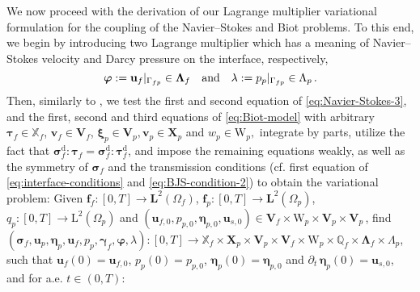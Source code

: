 \documentclass[11pt]{article}
\numberwithin{equation}{section}
\newcommand{\bgamma}{{\boldsymbol\gamma}}
\newcommand{\bLambda}{{\boldsymbol\Lambda}}
\newcommand{\bbeta}{{\boldsymbol\eta}}
\newcommand{\bsi}{{\boldsymbol\sigma}}
\newcommand{\bvarphi}{{\boldsymbol\varphi}}
\newcommand{\btau}{{\boldsymbol\tau}}
\newcommand{\bxi}{{\boldsymbol\xi}}
\newcommand{\bv}{{\mathbf{v}}}
\newcommand{\f}{\mathbf{f}}
\newcommand{\bu}{\mathbf{u}}
\newcommand{\0}{{\mathbf{0}}}
\def\bX{\mathbf{X}}
\def\bV{\mathbf{V}}
\newcommand{\bL}{\mathbf{L}}
\newcommand\bbQ{\mathbb{Q}}
\newcommand\bbX{\mathbb{X}}
\def\L{\mathrm{L}}
\def\W{\mathrm{W}}
\def\rd{\mathrm{d}}
\def\qan{{\quad\hbox{and}\quad}}
\numberwithin{equation}{section}
\begin{document}
We now proceed with the derivation of our Lagrange multiplier variational formulation for the coupling of the Navier--Stokes and Biot problems.
To this end, we begin by introducing two Lagrange multiplier which has a meaning of Navier--Stokes velocity and Darcy pressure on the interface, respectively,
\begin{equation*}
\bvarphi := \bu_f|_{\Gamma_{fp}} \in \bLambda_f \qan 
\lambda := p_p|_{\Gamma_{fp}}\in \Lambda_p \,.
\end{equation*}
Then, similarly to \cite{cgos2017,aeny2019}, we test the first and second equation of \eqref{eq:Navier-Stokes-3}, and the first, second and third equations of \eqref{eq:Biot-model} with arbitrary $\btau_f\in \bbX_f$, $\bv_f\in \bV_f$, $\bxi_p\in \bV_p,\bv_p\in \bX_p$ and $w_p\in\W_p,$  integrate by parts, utilize the fact that $\bsi^\rd_f:\btau_f = \bsi^\rd_f:\btau^\rd_f$, and impose the remaining equations weakly, as well as the symmetry of $\bsi_f$ and the transmission conditions (cf. first equation of \eqref{eq:interface-conditions} and \eqref{eq:BJS-condition-2}) to obtain the variational problem: Given 
$\f_f : [0,T]\to \bL^2(\Omega_f)$, $\f_p : [0,T]\to \bL^2(\Omega_p)$, $q_p : [0,T]\to \L^2(\Omega_p)$
and $(\bu_{f,0},p_{p,0},\bbeta_{p,0},\bu_{s,0})\in \bV_f\times \W_p\times \bV_p\times \bV_p$\,,
find $(\bsi_f,\bu_p, \bbeta_p, \bu_f, p_p, \bgamma_f, \bvarphi, \lambda) : [0,T]\to \bbX_f\times \bX_p\times \bV_p\times \bV_f\times \W_p\times \bbQ_f\times \bLambda_f\times \Lambda_p$, such that $\bu_f(0)=\bu_{f,0}$, $p_p(0)=p_{p,0}$, $\bbeta_p(0)=\bbeta_{p,0}$ and $\partial_t\,\bbeta_p(0) = \bu_{s,0}$, and for a.e. $t\in (0,T)$:
\end{document}
